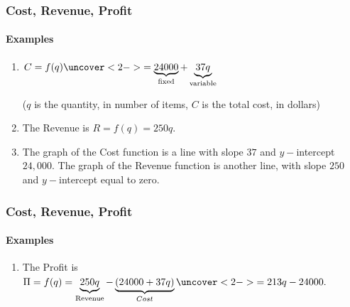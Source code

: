 \documentclass[9pt,xcolor=x11names,compress]{beamer}
\begin{document}
\begin{frame}[t]
\frametitle{Cost, Revenue, Profit}
\framesubtitle{Examples}
\begin{enumerate}
\item<1-> $C=f(q) \uncover<2->{=\underbrace{24000}_{\text{fixed}}+\underbrace{37q}_{\text{variable}}}$

($q$ is the quantity, in number of items, $C$ is the total cost, in dollars)
\item<3-> The Revenue is $R=f(q)=250q$.  
\item<4-> The graph of the \alert{Cost function} is a line with slope $37$ and $y-$intercept $24,000$.  The graph of the \alert{Revenue function} is another line, with slope $250$ and $y-$intercept equal to zero.

\end{enumerate}
\end{frame}

\begin{frame}[t]\frametitle{Cost, Revenue, Profit}
\framesubtitle{Examples}

\begin{enumerate}\addtocounter{enumi}{3}
\item<1-> The Profit is $\Pi=f(q)=\underbrace{250q}_{\text{Revenue}}-\underbrace{(24000+37q)}_{Cost} \uncover<2->{=213q-24000.}$  

\end{enumerate}
\end{frame}
\end{document}
